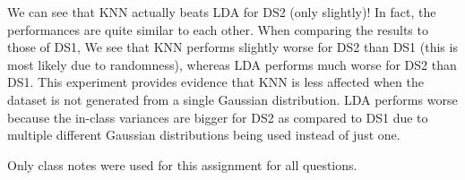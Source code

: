 \documentclass{article}
\begin{document}
We can see that KNN actually beats LDA for DS2 (only slightly)! In fact, the performances are quite similar to each other. When comparing the results to those of DS1, We see that KNN performs slightly worse for DS2 than DS1 (this is most likely due to randomness), whereas LDA performs much worse for DS2 than DS1. This experiment provides evidence that KNN is less affected when the dataset is not generated from a single Gaussian distribution. LDA performs worse because the in-class variances are bigger for DS2 as compared to DS1 due to multiple different Gaussian distributions being used instead of just one.

\begin{thebibliography}{9}
Only class notes were used for this assignment for all questions.
\end{thebibliography}
\end{document}
